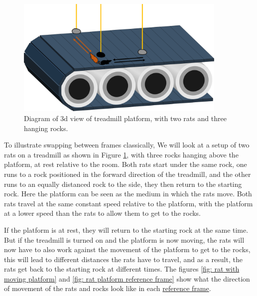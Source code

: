 \begin{figure}[H]
	\centering
	\includegraphics[width=0.9\textwidth]{images/pdf/Conveyor_belt_3d.pdf}
	\caption{Diagram of 3d view of treadmill platform, with two rats and three hanging rocks.}
	\label{fig: 3d conveyor belt}
\end{figure}

To illustrate swapping between frames classically, We will look at a setup of two rats on a treadmill as shown in Figure \ref{fig: 3d conveyor belt}, with three rocks hanging above the platform, at rest relative to the room. Both rats start under the same rock, one runs to a rock positioned in the forward direction of the treadmill, and the other runs to an equally distanced rock to the side, they then return to the starting rock. Here the platform can be seen as the medium in which the rats move. Both rats travel at the same constant speed relative to the platform, with the platform at a lower speed than the rats to allow them to get to the rocks.

If the platform is at rest, they will return to the starting rock at the same time. But if the treadmill is turned on and the platform is now moving, the rats will now have to also work against the movement of the platform to get to the rocks, this will lead to different distances the rats have to travel, and as a result, the rats get back to the starting rock at different times. The figures \ref{fig: rat with moving platform} and \ref{fig: rat platform reference frame} show what the direction of movement of the rats and rocks look like in each \hyperlink{def-Reference-frame}{reference frame}.


